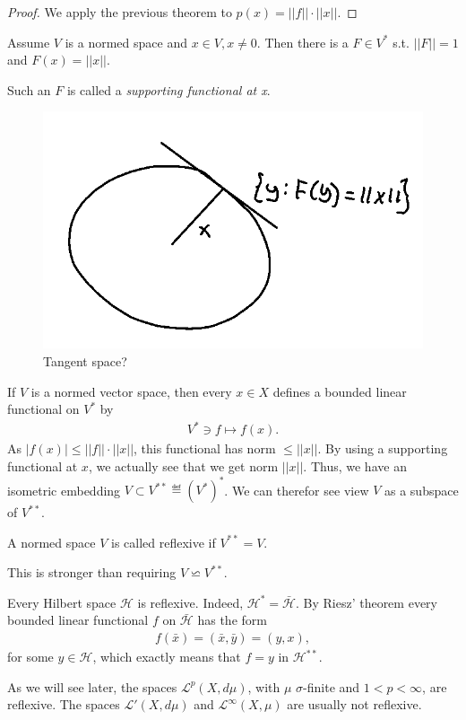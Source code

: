 \ifdetailed
\begin{proof}
    We apply the previous theorem to \(p(x)=||f||\cdot ||x||\).
\end{proof}
\fi 
\begin{corollary}
    Assume \(V\) is a normed space and \(x\in V, x\neq0\). Then there is a \(F\in V^*\) s.t. \(||F||=1\) and \(F(x) = ||x||\).
\end{corollary}

Such an \(F\) is called a \emph{supporting functional at x}.
\begin{figure}[H]
    \centering
    \includegraphics[scale=0.4]{../Figs/hanah_banach1.png}
    \caption{Tangent space?}
\end{figure}
If \(V\) is a normed vector space, then every \(x\in X\) defines a bounded linear functional on \(V^*\) by 
\begin{align*}
    V^*\ni f\mapsto f(x).
\end{align*}
As \(|f(x)|\leq ||f||\cdot ||x||\), this functional has norm \(\leq ||x||\). By using a supporting functional at \(x\), we actually see that
we get norm \(||x||\). Thus, we have an isometric embedding \(V\subset V^{**}\eqdef (V^*)^*\). We can therefor see view \(V\) as a subspace
of \(V^{**}\).
\begin{definition}
    A normed space \(V\) is called reflexive if \(V^{**}=V\).
\end{definition}
\begin{remark}
    This is stronger than requiring \(V\backsimeq V^{**}\).
\end{remark}
\begin{remark}
    Every Hilbert space \(\mathcal{H}\) is reflexive. Indeed, \(\mathcal{H}^*=\bar{\mathcal{H}}\). By Riesz' theorem every bounded linear 
    functional \(f\) on \(\bar{\mathcal{H}}\) has the form
    \begin{align*}
        f(\bar{x}) = (\bar{x}, \bar{y}) = (y,x),
    \end{align*}
    for some \(y\in\mathcal{H}\), which exactly means that \(f=y\) in \(\mathcal{H}^{**}\).

    As we will see later, the spaces \(\mathcal{L}^{p}(X,d\mu)\), with \(\mu\) \(\sigma\)-finite and \(1<p<\infty\), are reflexive. The spaces
    \(\mathcal{L}'(X, d\mu)\) and \(\mathcal{L}^{\infty}(X,\mu)\) are usually not reflexive.
\end{remark}
